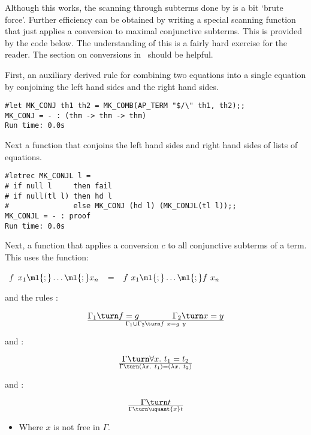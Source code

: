 Although this works, the scanning through subterms done by
 is a bit `brute force'. Further efficiency can
be obtained by writing a special scanning function that
just applies a conversion to maximal conjunctive subterms.
This is provided by the code below. 
The understanding of this is a fairly hard exercise for the reader. The
section on conversions in \DESCRIPTION\ should be helpful.

First, an auxiliary derived rule for combining two equations into
a single equation by conjoining  the left hand sides and  the
right hand sides.

\begin{session}\begin{verbatim}
#let MK_CONJ th1 th2 = MK_COMB(AP_TERM "$/\" th1, th2);;
MK_CONJ = - : (thm -> thm -> thm)
Run time: 0.0s
\end{verbatim}\end{session}

\noindent Next a function that conjoins the left hand sides and right
hand sides of lists of equations.

\begin{session}\begin{verbatim}
#letrec MK_CONJL l =
# if null l     then fail
# if null(tl l) then hd l
#               else MK_CONJ (hd l) (MK_CONJL(tl l));;
MK_CONJL = - : proof
Run time: 0.0s
\end{verbatim}\end{session}

\noindent Next, a function that applies a conversion $c$ to all
conjunctive subterms of a term. This uses the \ML{} function:

\bigskip
{}~$f$~\ml{[}$x_1\ml{;}\ldots\ml{;}x_n$\ml{]}~~=~~\ml{[}$f\ x_1\ml{;}\ldots\ml{;}f\ x_n$\ml{]}

\bigskip

\noindent and the rules :


\[ \Gamma_1 \turn f = g \qquad\qquad \Gamma_2\turn x = y \over
\Gamma_1 \cup \Gamma_2 \turn f\ x = g\ y\]

\noindent and :


\[ \Gamma \turn \forall x.\ t_1 = t_2 \over
\Gamma \turn (\lambda x.\ t_1) = (\lambda x.\ t_2)\]

\noindent and :

$$\Gamma\turn t\over\Gamma\turn\uquant{x} t$$
\begin{itemize}
\item Where $x$ is not free in $\Gamma$.
\end{itemize}


